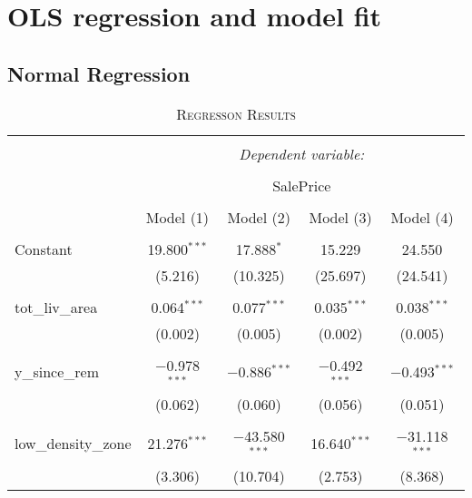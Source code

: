 \documentclass[a4paper]{article}
\begin{document}
\section{OLS regression and model fit}
\subsection{Normal Regression}




\begin{table}[!htbp] \centering 
\begin{adjustwidth}{-0.0cm}{-0cm}
\begin{threeparttable}
\small
\captionsetup{font=small, justification=raggedright,singlelinecheck=false}
\caption{\textsc{Regresson Results}}
\centering 
  \label{}
\begin{tabular}{@{\extracolsep{1pt}}lcccc} 
\\[-5.8ex]\hline 
\hline \\[-1.8ex] 
 & \multicolumn{4}{c}{\textit{Dependent variable:}} \\ 
\cline{2-5} 
\\[-1.8ex] & \multicolumn{4}{c}{SalePrice} \\ 
\\[-1.8ex] & Model (1) & Model (2) & Model (3) & Model (4)\\ 
\hline \\[-1.8ex] 
 Constant & 19.800$^{***}$ & 17.888$^{*}$ & 15.229 & 24.550 \\ 
  & (5.216) & (10.325) & (25.697) & (24.541) \\ 
  & & & & \\ 
 tot\_liv\_area & 0.064$^{***}$ & 0.077$^{***}$ & 0.035$^{***}$ & 0.038$^{***}$ \\ 
  & (0.002) & (0.005) & (0.002) & (0.005) \\ 
  & & & & \\ 
 y\_since\_rem & $-$0.978$^{***}$ & $-$0.886$^{***}$ & $-$0.492$^{***}$ & $-$0.493$^{***}$ \\ 
  & (0.062) & (0.060) & (0.056) & (0.051) \\ 
  & & & & \\ 
 low\_density\_zone & 21.276$^{***}$ & $-$43.580$^{***}$ & 16.640$^{***}$ & $-$31.118$^{***}$ \\ 
  & (3.306) & (10.704) & (2.753) & (8.368) \\ 

\end{tabular}
\end{threeparttable}
\end{adjustwidth}
\end{table}
\end{document}
